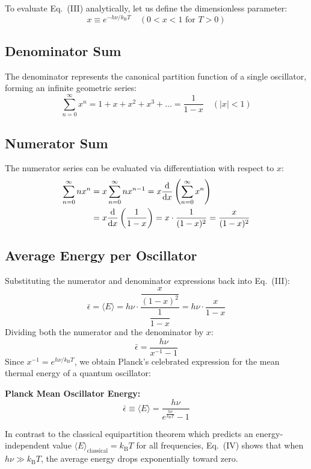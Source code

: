 \documentclass[11pt,a4paper]{article}
\newcommand{\diff}{\mathrm{d}}
\newcommand{\kB}{k_{\mathrm{B}}}
\newcommand{\avgE}{\langle E \rangle}
\begin{document}
To evaluate Eq.~(III) analytically, let us define the dimensionless parameter:
\begin{equation}
    x \equiv e^{-h\nu / \kB T} \quad (0 < x < 1 \text{ for } T > 0)
\end{equation}

\subsection{Denominator Sum}
The denominator represents the canonical partition function of a single oscillator, forming an infinite geometric series:
\begin{equation}
    \sum_{n=0}^{\infty} x^n = 1 + x + x^2 + x^3 + \dots = \frac{1}{1 - x} \quad (|x| < 1)
\end{equation}

\subsection{Numerator Sum}
The numerator series can be evaluated via differentiation with respect to $x$:
\begin{align}
    \sum_{n=0}^{\infty} n x^n &= x \sum_{n=0}^{\infty} n x^{n-1} 
    = x \frac{\diff}{\diff x}\left( \sum_{n=0}^{\infty} x^n \right) \notag \\
    &= x \frac{\diff}{\diff x}\left( \frac{1}{1 - x} \right) 
    = x \cdot \frac{1}{(1 - x)^2} = \frac{x}{(1 - x)^2}
\end{align}

\subsection{Average Energy per Oscillator}
Substituting the numerator and denominator expressions back into Eq.~(III):
\begin{equation}
    \bar{\epsilon} = \avgE = h\nu \cdot \frac{\dfrac{x}{(1 - x)^2}}{\dfrac{1}{1 - x}} = h\nu \cdot \frac{x}{1 - x}
\end{equation}
Dividing both the numerator and the denominator by $x$:
\begin{equation}
    \bar{\epsilon} = \frac{h\nu}{x^{-1} - 1}
\end{equation}
Since $x^{-1} = e^{h\nu / \kB T}$, we obtain Planck's celebrated expression for the mean thermal energy of a quantum oscillator:

\begin{resultbox}
\textbf{Planck Mean Oscillator Energy:}
\begin{equation}
    \boxed{\bar{\epsilon} \equiv \avgE = \frac{h\nu}{e^{\frac{h\nu}{\kB T}} - 1}} \tag{IV}
\end{equation}
\end{resultbox}
In contrast to the classical equipartition theorem which predicts an energy-independent value $\avgE_{\text{classical}} = \kB T$ for all frequencies, Eq.~(IV) shows that when $h\nu \gg \kB T$, the average energy drops exponentially toward zero.
\end{document}
